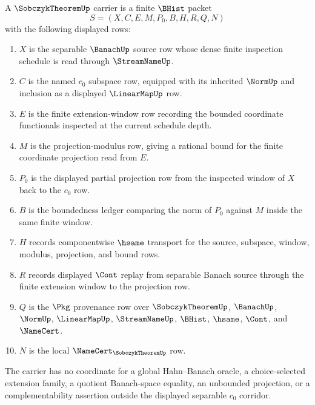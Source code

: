 \begin{definition}
\label{def:sobczyk-theorem-carrier}
A $\SobczykTheoremUp$ carrier is a finite $\BHist$ packet
$$
S=(X,C,E,M,P_0,B,H,R,Q,N)
$$
with the following displayed rows:
\begin{enumerate}
\item $X$ is the separable $\BanachUp$ source row whose dense finite inspection schedule is read through $\StreamNameUp$.
\item $C$ is the named $c_0$ subspace row, equipped with its inherited $\NormUp$ and inclusion as a displayed $\LinearMapUp$ row.
\item $E$ is the finite extension-window row recording the bounded coordinate functionals inspected at the current schedule depth.
\item $M$ is the projection-modulus row, giving a rational bound for the finite coordinate projection read from $E$.
\item $P_0$ is the displayed partial projection row from the inspected window of $X$ back to the $c_0$ row.
\item $B$ is the boundedness ledger comparing the norm of $P_0$ against $M$ inside the same finite window.
\item $H$ records componentwise $\hsame$ transport for the source, subspace, window, modulus, projection, and bound rows.
\item $R$ records displayed $\Cont$ replay from separable Banach source through the finite extension window to the projection row.
\item $Q$ is the $\Pkg$ provenance row over $\SobczykTheoremUp$, $\BanachUp$, $\NormUp$, $\LinearMapUp$, $\StreamNameUp$, $\BHist$, $\hsame$, $\Cont$, and $\NameCert$.
\item $N$ is the local $\NameCert_{\SobczykTheoremUp}$ row.
\end{enumerate}
The carrier has no coordinate for a global Hahn--Banach oracle, a choice-selected extension family, a quotient Banach-space equality, an unbounded projection, or a complementability assertion outside the displayed separable $c_0$ corridor.
\end{definition}

